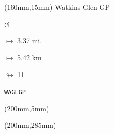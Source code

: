 \begin{textblock*}{40mm}(160mm,15mm)%
Watkins Glen GP
\par \Huge$\circlearrowleft$
\Large
\par$\mapsto$ 3.37 mi.
\par$\mapsto$ 5.42 km
\par$\looparrowright$ 11
\par\hfill\tiny\tt WAGLGP\\
\end{textblock*}
\begin{textblock*}{20mm}(200mm,5mm)%
\fbox{\thepage}
\end{textblock*}
\begin{textblock*}{20mm}(200mm,285mm)%
\fbox{\thepage}
\end{textblock*}
\null\newpage

